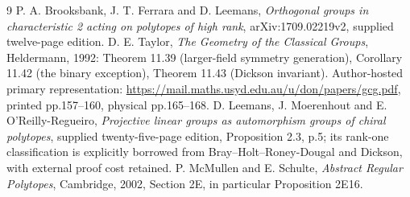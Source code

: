 \documentclass[11pt,a4paper]{article}
\begin{document}
\begin{thebibliography}{9}
 P. A. Brooksbank, J. T. Ferrara and D. Leemans,
\emph{Orthogonal groups in characteristic 2 acting on polytopes
of high rank}, arXiv:1709.02219v2, supplied twelve-page edition.
 D. E. Taylor, \emph{The Geometry of the Classical
Groups}, Heldermann, 1992: Theorem 11.39 (larger-field symmetry
generation), Corollary 11.42 (the binary exception), Theorem 11.43
(Dickson invariant). Author-hosted primary representation:
\url{https://mail.maths.usyd.edu.au/u/don/papers/gcg.pdf},
printed pp.157--160, physical pp.165--168.
 D. Leemans, J. Moerenhout and E. O'Reilly-Regueiro,
\emph{Projective linear groups as automorphism groups of chiral
polytopes}, supplied twenty-five-page edition, Proposition 2.3,
p.5; its rank-one classification is explicitly borrowed from
Bray--Holt--Roney-Dougal and Dickson, with external proof cost retained.
 P. McMullen and E. Schulte, \emph{Abstract Regular
Polytopes}, Cambridge, 2002, Section 2E, in particular Proposition 2E16.
\end{thebibliography}
\end{document}
